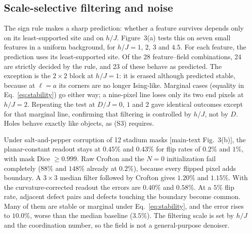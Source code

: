 \documentclass[11pt,a4paper]{article}
\begin{document}
\subsection{Scale-selective filtering and noise}\label{subsec:res:noise}
The sign rule makes a sharp prediction: whether a feature survives depends only on its least-supported site and on $h/J$. Figure~3(a) tests this on seven small features in a uniform background, for $h/J=1$, $2$, $3$ and $4.5$. For each feature, the prediction uses its least-supported site. Of the 28 feature--field combinations, 24 are strictly decided by the rule, and 23 of these behave as predicted. The exception is the $2\times2$ block at $h/J=1$: it is erased although predicted stable, because at $\ell=a$ its corners are no longer Ising-like. Marginal cases (equality in Eq.~\eqref{eq:stability}) go either way; a nine-pixel line loses only its two end pixels at $h/J=2$. Repeating the test at $D/J=0$, $1$ and $2$ gave identical outcomes except for that marginal line, confirming that filtering is controlled by $h/J$, not by $D$. Holes behave exactly like objects, as (S3) requires.

Under salt-and-pepper corruption of 12 stadium masks [main-text Fig.~3(b)], the planar-constant readout stays at $0.45\%$ and $0.43\%$ for flip rates of $0.2\%$ and $1\%$, with mask Dice $\ge0.999$. Raw Crofton and the $N=0$ initialization fail completely ($88\%$ and $148\%$ already at $0.2\%$), because every flipped pixel adds boundary. A $3\times3$ median filter followed by Crofton gives $1.20\%$ and $1.15\%$. With the curvature-corrected readout the errors are $0.40\%$ and $0.58\%$. At a $5\%$ flip rate, adjacent defect pairs and defects touching the boundary become common. Many of them are stable or marginal under Eq.~\eqref{eq:stability}, and the error rises to $10.0\%$, worse than the median baseline ($3.5\%$). The filtering scale is set by $h/J$ and the coordination number, so the field is not a general-purpose denoiser.
\end{document}
